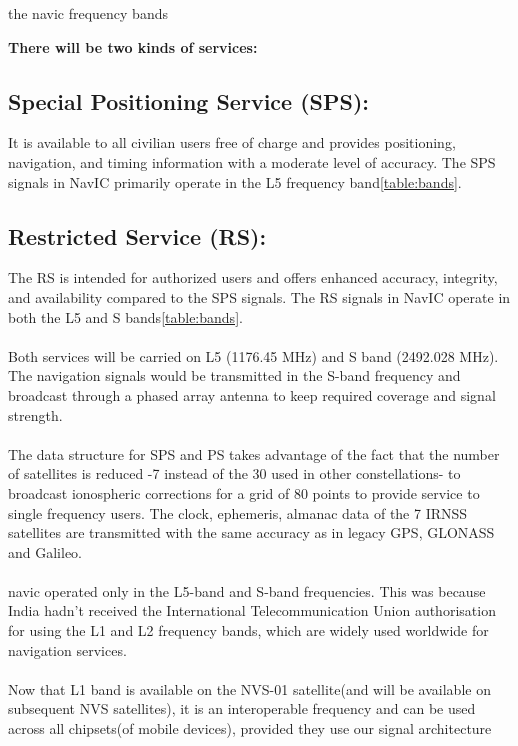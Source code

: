 \documentclass[11pt]{book}
\begin{document}
		
	\begin{table}[h!]
	\small
	\centering
	\caption{the navic frequency bands}
	\label{table:bands}
	
	\end{table}
\textbf{There will be two kinds of services:}
\subsection{Special Positioning Service (SPS):}
	It is available to all civilian users free of charge and provides positioning, navigation, and timing information with a moderate level of accuracy. The SPS signals in NavIC primarily operate in the L5 frequency band\ref{table:bands}.
\subsection{Restricted Service (RS):}
The RS is intended for authorized users and offers enhanced accuracy, integrity, and availability compared to the SPS signals. The RS signals in NavIC operate in both the L5 and S bands\ref{table:bands}.
	\\
	\\
Both services will be carried on L5 (1176.45 MHz) and S band (2492.028 MHz). The navigation signals would be transmitted in the S-band frequency and broadcast through a phased array antenna to keep required coverage and signal strength.
\\
\\
The data structure for SPS and PS takes advantage of the fact that the number of satellites is reduced -7 instead of the 30 used in other constellations- to broadcast ionospheric corrections for a grid of 80 points to provide service to single frequency users. The clock, ephemeris, almanac data of the 7 IRNSS satellites are transmitted with the same accuracy as in legacy GPS, GLONASS and Galileo.
\\
\\
navic operated only in the L5-band and S-band frequencies. This was because India hadn't received the International Telecommunication Union authorisation for using the L1 and L2 frequency bands, which are widely used worldwide for navigation services.
\\
\\
Now that L1 band is available on the NVS-01 satellite(and will be available on subsequent NVS satellites), it is an interoperable frequency and can be used across all chipsets(of mobile devices), provided they use our signal architecture
\\\\
\end{document}
